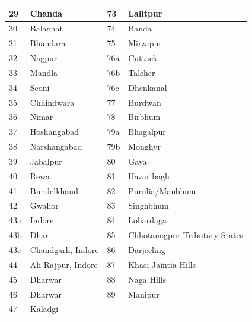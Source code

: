 \begin{longtable}{|l|p{3.3cm}|l|p{3.3cm}|}
\hline
29 & Chanda & 73 & Lalitpur \\
\hline
30 & Balaghat & 74 & Banda \\
\hline
31 & Bhandara & 75 & Mirzapur \\
\hline
32 & Nagpur & 76a & Cuttack \\
\hline
33 & Mandla & 76b & Talcher \\
\hline
34 & Seoni & 76c & Dhenkanal \\
\hline
35 & Chhindwara & 77 & Burdwan \\
\hline
36 & Nimar & 78 & Birbhum \\
\hline
37 & Hoshangabad & 79a & Bhagalpur \\
\hline
38 & Narshangabad & 79b & Monghyr \\
\hline
39 & Jabalpur & 80 & Gaya \\
\hline
40 & Rewa & 81 & Hazaribagh \\
\hline
41 & Bundelkhand & 82 & Purulia/Manbhum \\
\hline
42 & Gwalior & 83 & Singhbhum \\
\hline
43a & Indore & 84 & Lohardaga \\
\hline
43b & Dhar & 85 & Chhotanagpur Tributary States \\
\hline
43c & Chandgarh, Indore & 86 & Darjeeling \\
\hline
44 & Ali Rajpur, Indore & 87 & Khasi-Jaintia Hills \\
\hline
45 & Dharwar & 88 & Naga Hills \\
\hline
46 & Dharwar & 89 & Manipur \\
\hline
47 & Kaladgi &  &  \\
\hline
\end{longtable}

